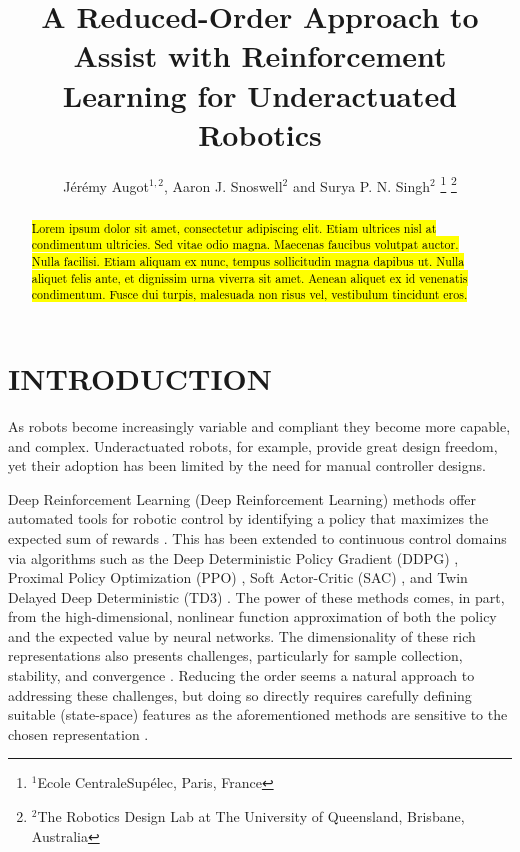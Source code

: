 \documentclass[letterpaper, 10 pt, conference]{ieeeconf}
\title{
    \LARGE \bf%
    A Reduced-Order Approach to Assist with Reinforcement Learning for Underactuated Robotics
}
\author{
    J\'er\'emy Augot$^{1,2}$, Aaron J. Snoswell$^{2}$ and Surya P. N. Singh$^{2}$
    \thanks{
        $^{1}$Ecole CentraleSup\'elec, Paris, France
    }%
    \thanks{
        $^{2}$The Robotics Design Lab at The University of Queensland, Brisbane, Australia
    }%
}
\begin{document}
\maketitle
\thispagestyle{empty}
\pagestyle{empty}

\begin{abstract}

\hl{Lorem ipsum dolor sit amet, consectetur adipiscing elit. Etiam ultrices nisl at condimentum ultricies. Sed vitae odio magna. Maecenas faucibus volutpat auctor. Nulla facilisi. Etiam aliquam ex nunc, tempus sollicitudin magna dapibus ut. Nulla aliquet felis ante, et dignissim urna viverra sit amet. Aenean aliquet ex id venenatis condimentum. Fusce dui turpis, malesuada non risus vel, vestibulum tincidunt eros.}

\end{abstract}

\section{INTRODUCTION}

As robots become increasingly variable and compliant they become more capable, and complex.
Underactuated robots, for example, provide great design freedom, yet their adoption has been limited by the need for manual controller designs.

Deep Reinforcement Learning (Deep Reinforcement Learning) methods offer automated tools for robotic control by identifying a policy that maximizes the expected sum of rewards \cite{henderson2018deep}.
This has been extended to continuous control domains via algorithms such as the Deep Deterministic Policy Gradient (DDPG) \cite{DDPG}, Proximal Policy Optimization (PPO) \cite{PPO}, Soft Actor-Critic (SAC) \cite{SAC}, and Twin Delayed Deep Deterministic (TD3) \cite{TD3}.
The power of these methods comes, in part, from the high-dimensional, nonlinear function approximation of both the policy and the expected value by neural networks.
The dimensionality of these rich representations also presents challenges, particularly for sample collection, stability, and convergence \cite{Islam2017}.
Reducing the order seems a natural approach to addressing these challenges, but doing so directly requires carefully defining suitable (state-space) features as the aforementioned methods are sensitive to the chosen representation \cite{bhatnagar2009convergent}. 
\end{document}
